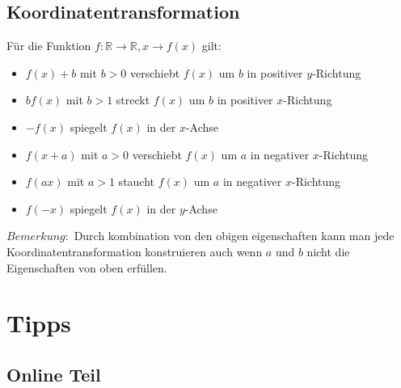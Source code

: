 \documentclass[11pt]{article} %
\begin{document}
\subsection{Koordinatentransformation}
Für die Funktion $f: \mathbb{R} \rightarrow \mathbb{R}, x \rightarrow f(x)$ gilt:
\begin{itemize}
\item $f(x)+b$ mit $b > 0$ verschiebt $f(x)$ um $b$ in positiver $y$-Richtung
\item $b f(x)$ mit $b>1$ streckt $f(x)$ um $b$ in positiver $x$-Richtung
\item $-f(x)$ spiegelt $f(x)$ in der $x$-Achse
\item $f(x+a)$ mit $a > 0$ verschiebt $f(x)$ um $a$ in negativer $x$-Richtung
\item $f(ax)$ mit $a > 1 $ staucht $f(x)$ um $a$ in negativer $x$-Richtung
\item $f(-x)$ spiegelt $f(x)$ in der $y$-Achse
\end{itemize}

$Bemerkung:$ Durch kombination von den obigen eigenschaften kann man jede Koordinatentransformation konstruieren auch wenn $a$ und $b$ nicht die Eigenschaften von oben erfüllen.

\section{Tipps}
\subsection{Online Teil}
\end{document}
